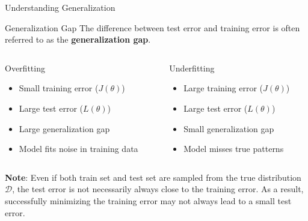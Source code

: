 \documentclass{beamer}
\begin{document}
\begin{frame}{Understanding Generalization}
    \begin{block}{Generalization Gap}
        The difference between test error and training error is often referred to as the \textbf{generalization gap}.
    \end{block}

    \begin{columns}[T]
        \begin{column}{0.48\textwidth}
            \begin{alertblock}{Overfitting}
                \begin{itemize}
                    \item Small training error ($J(\theta)$)
                    \item Large test error ($L(\theta)$)
                    \item Large generalization gap
                    \item Model fits noise in training data
                \end{itemize}
            \end{alertblock}
        \end{column}
        \begin{column}{0.48\textwidth}
            \begin{alertblock}{Underfitting}
                \begin{itemize}
                    \item Large training error ($J(\theta)$)
                    \item Large test error ($L(\theta)$)
                    \item Small generalization gap
                    \item Model misses true patterns
                \end{itemize}
            \end{alertblock}
        \end{column}
    \end{columns}

    \vspace{0.5cm}
    \footnotesize \textbf{Note}: Even if both train set and test set are sampled from the true distribution $\mathcal{D}$, the test error is not necessarily always close to the training error. As a result, successfully minimizing the training error may not always lead to a small test error.
\end{frame}
\end{document}
